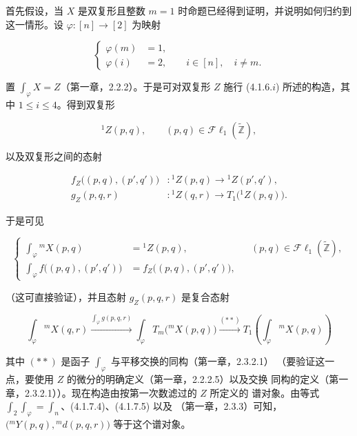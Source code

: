 \clearpage
{}%
\begingroup\small\setlength{\parskip}{0pt}\setlength{\emergencystretch}{1.5em}
\setlength{\abovedisplayskip}{4pt plus 2pt minus 2pt}%
\setlength{\belowdisplayskip}{4pt plus 2pt minus 2pt}%

首先假设，当 $X$ 是双复形且整数 $m=1$ 时命题已经得到证明，并说明如何归约到
这一情形。设 $\varphi\colon[n]\longrightarrow[2]$ 为映射

\begin{equation}
\left\{
\begin{aligned}
\varphi(m)&=1,\\
\varphi(i)&=2,\qquad i\in[n],\quad i\neq m.
\end{aligned}
\right.
\tag{4.1.7.1}
\end{equation}

置 $\int_\varphi X=Z$（第一章，2.2.2）。于是可对双复形 $Z$ 施行
(4.1.6.$i$) 所述的构造，其中 $1\leq i\leq4$。得到双复形

\begin{equation}
{}^{1}\!Z(p,q),\qquad
(p,q)\in\mathcal{F}\ell_1(\widetilde{\mathbb Z}),
\tag{4.1.7.2}
\end{equation}

以及双复形之间的态射

\begin{equation}
\begin{aligned}
f_Z\bigl((p,q),(p',q')\bigr)&\colon
{}^{1}\!Z(p,q)\longrightarrow{}^{1}\!Z(p',q'),\\
g_Z(p,q,r)&\colon
{}^{1}\!Z(q,r)\longrightarrow T_1\bigl({}^{1}\!Z(p,q)\bigr).
\end{aligned}
\tag{4.1.7.3}
\end{equation}

于是可见

\begin{equation}
\left\{
\begin{aligned}
\int_\varphi{}^{m}\!X(p,q)
  &={}^{1}\!Z(p,q),
  &&(p,q)\in\mathcal{F}\ell_1(\widetilde{\mathbb Z}),\\
\int_\varphi f\bigl((p,q),(p',q')\bigr)
  &=f_Z\bigl((p,q),(p',q')\bigr),
\end{aligned}
\right.
\tag{4.1.7.4}
\end{equation}

（这可直接验证），并且态射 $g_Z(p,q,r)$ 是复合态射

\begin{equation}
\int_\varphi{}^{m}\!X(q,r)
\xrightarrow{\int_\varphi g(p,q,r)}
\int_\varphi T_m\bigl({}^{m}\!X(p,q)\bigr)
\xrightarrow{(**)}
T_1\left(\int_\varphi{}^{m}\!X(p,q)\right)
\tag{4.1.7.5}
\end{equation}

其中 $(**)$ 是函子 $\int_\varphi$ 与平移交换的同构（第一章，2.3.2.1）
（要验证这一点，要使用 $Z$ 的微分的明确定义（第一章，2.2.2.5）以及交换
同构的定义（第一章，2.3.2.1））。现在构造由按第一次数滤过的 $Z$ 所定义的
谱对象。由等式 $\int_2\int_\varphi=\int_n$、(4.1.7.4)、(4.1.7.5) 以及
（第一章，2.3.3）可知，
$\bigl({}^{m}\!Y(p,q),{}^{m}\!d(p,q,r)\bigr)$ 等于这个谱对象。
\endgroup
